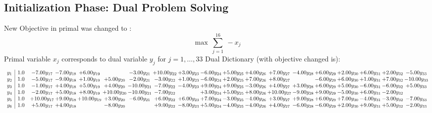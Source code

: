 \documentclass[9pt]{article}
\begin{document}
\subsection{Initialization Phase: Dual Problem Solving}
New Objective in primal was changed to : \[ \max\ \sum_{j=1}^{16}\ - x_j \] 
Primal variable $x_j$ corresponds to dual variable $y_j$ for $j = 1,\ldots,33$
Dual Dictionary (with objective changed is): 
\[\begin{array}{c| c c@{\hskip 2pt} c@{\hskip 2pt} c@{\hskip 2pt} c@{\hskip 2pt} c@{\hskip 2pt} c@{\hskip 2pt} c@{\hskip 2pt} c@{\hskip 2pt} c@{\hskip 2pt} c@{\hskip 2pt} c@{\hskip 2pt} c@{\hskip 2pt} c@{\hskip 2pt} c@{\hskip 2pt} c@{\hskip 2pt} c@{\hskip 2pt} c@{\hskip 2pt} }
 y_{1}   &  1.0 & -7.00 y_{17} & -7.00 y_{18} & +  6.00 y_{19} &   & -3.00 y_{21} & + 10.00 y_{22} & +  3.00 y_{23} & -6.00 y_{24} & +  5.00 y_{25} & +  4.00 y_{26} & +  7.00 y_{27} & -4.00 y_{28} & +  6.00 y_{29} & +  2.00 y_{30} & +  6.00 y_{31} & +  2.00 y_{32} & -5.00 y_{33}\\
 y_{2}   &  1.0 & -5.00 y_{17} & -9.00 y_{18} & +  1.00 y_{19} & +  5.00 y_{20} & -2.00 y_{21} & -3.00 y_{22} & +  1.00 y_{23} & -6.00 y_{24} & +  2.00 y_{25} & +  7.00 y_{26} & +  8.00 y_{27} &   & -6.00 y_{29} & +  6.00 y_{30} & +  1.00 y_{31} & +  7.00 y_{32} & -10.00 y_{33}\\
 y_{3}   &  1.0 & -1.00 y_{17} & +  4.00 y_{18} & +  5.00 y_{19} & +  4.00 y_{20} & -10.00 y_{21} & -7.00 y_{22} & -4.00 y_{23} & +  9.00 y_{24} & +  9.00 y_{25} & -3.00 y_{26} & +  4.00 y_{27} & +  3.00 y_{28} & +  6.00 y_{29} & +  5.00 y_{30} & -6.00 y_{31} & -6.00 y_{32} & +  5.00 y_{33}\\
 y_{4}   &  1.0 & -2.00 y_{17} & +  5.00 y_{18} & +  8.00 y_{19} & + 10.00 y_{20} & -10.00 y_{21} & -7.00 y_{22} &   & +  3.00 y_{24} & +  5.00 y_{25} & +  8.00 y_{26} & + 10.00 y_{27} & -9.00 y_{28} & +  9.00 y_{29} & -5.00 y_{30} & +  6.00 y_{31} & -2.00 y_{32} &   \\
 y_{5}   &  1.0 & + 10.00 y_{17} & +  9.00 y_{18} & + 10.00 y_{19} & +  3.00 y_{20} & -6.00 y_{21} & +  6.00 y_{22} & +  6.00 y_{23} & +  7.00 y_{24} & -3.00 y_{25} & -4.00 y_{26} & +  3.00 y_{27} & +  9.00 y_{28} & +  6.00 y_{29} & +  7.00 y_{30} & -4.00 y_{31} & -3.00 y_{32} & -7.00 y_{33}\\
 y_{6}   &  1.0 & +  5.00 y_{17} & +  4.00 y_{18} &   & -8.00 y_{20} &   & +  9.00 y_{22} & -8.00 y_{23} & +  5.00 y_{24} & -4.00 y_{25} & -4.00 y_{26} & +  4.00 y_{27} & -6.00 y_{28} & -6.00 y_{29} & +  2.00 y_{30} & +  9.00 y_{31} & +  5.00 y_{32} & -2.00 y_{33}\\

\end{array}\]
\end{document}
